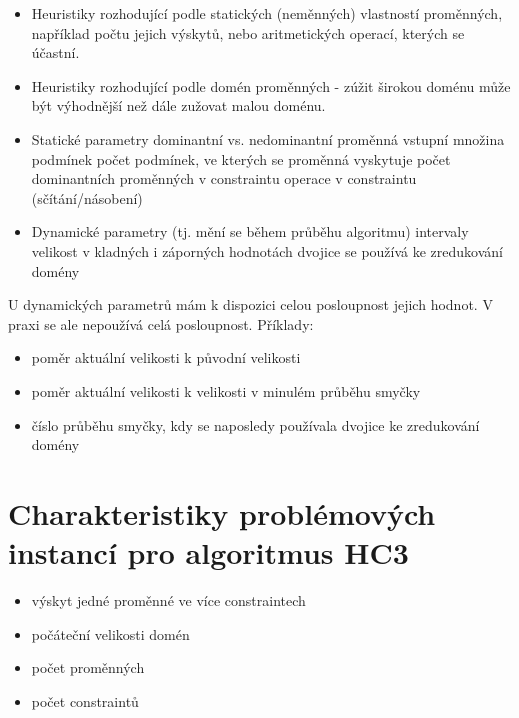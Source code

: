 \begin{itemize}
  \item Heuristiky rozhodující podle statických (neměnných) vlastností proměnných, například počtu jejich výskytů, nebo aritmetických operací, kterých se účastní.
  \item Heuristiky rozhodující podle domén proměnných - zúžit širokou doménu může být výhodnější než dále zužovat malou doménu.
\end{itemize}

\begin{itemize}
  \item Statické parametry
    \subitem dominantní vs. nedominantní proměnná
    \subitem vstupní množina podmínek
        \subsubitem počet podmínek, ve kterých se proměnná vyskytuje
        \subsubitem počet dominantních proměnných v constraintu
        \subsubitem operace v constraintu (sčítání/násobení)
  \item Dynamické parametry (tj. mění se během průběhu algoritmu)
    \subitem intervaly
        \subsubitem velikost
        \subsubitem v kladných i záporných hodnotách
    \subitem dvojice se používá ke zredukování domény
\end{itemize}

U dynamických parametrů mám k dispozici celou posloupnost jejich hodnot. V praxi se ale nepoužívá celá posloupnost. Příklady:

\begin{itemize}
  \item poměr aktuální velikosti k původní velikosti
  \item poměr aktuální velikosti k velikosti v minulém průběhu smyčky
  \item číslo průběhu smyčky, kdy se naposledy používala dvojice ke zredukování domény
\end{itemize}


\section{Charakteristiky problémových instancí pro algoritmus HC3}
\begin{itemize}
  \item výskyt jedné proměnné ve více constraintech
  \item počáteční velikosti domén
  \item počet proměnných
  \item počet constraintů
\end{itemize}


